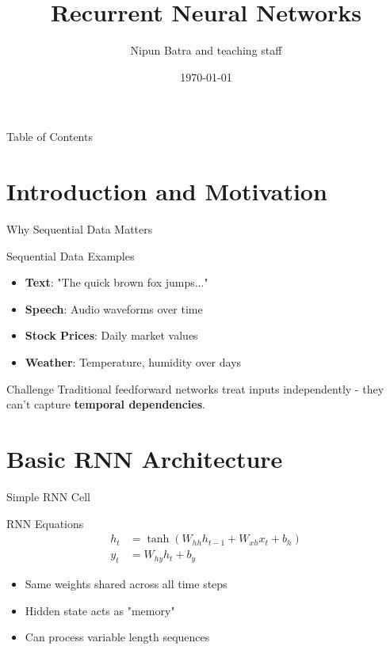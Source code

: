 \documentclass[usenames,dvipsnames]{beamer}
\title{Recurrent Neural Networks}
\date{\today}
\author{Nipun Batra and teaching staff}
\institute{IIT Gandhinagar}
\begin{document}
	\maketitle
	
	\begin{frame}{Table of Contents}
		\tableofcontents[hideallsubsections]
	\end{frame}
	
	\section{Introduction and Motivation}
	
	\begin{frame}{Why Sequential Data Matters}
		\begin{examplebox}{Sequential Data Examples}
			\begin{itemize}
				\item \textbf{Text}: "The quick brown fox jumps..."
				\item \textbf{Speech}: Audio waveforms over time
				\item \textbf{Stock Prices}: Daily market values
				\item \textbf{Weather}: Temperature, humidity over days
			\end{itemize}
		\end{examplebox}
		
		\begin{alertbox}{Challenge}
			Traditional feedforward networks treat inputs independently - they can't capture \textbf{temporal dependencies}.
		\end{alertbox}
	\end{frame}
	
	\section{Basic RNN Architecture}
	
	\begin{frame}{Simple RNN Cell}
		\begin{definitionbox}{RNN Equations}
			\begin{align}
				h_t &= \tanh(W_{hh} h_{t-1} + W_{xh} x_t + b_h) \\
				y_t &= W_{hy} h_t + b_y
			\end{align}
		\end{definitionbox}
		
		\begin{keypointsbox}
			\begin{itemize}
				\item Same weights shared across all time steps
				\item Hidden state acts as "memory"
				\item Can process variable length sequences
			\end{itemize}
		\end{keypointsbox}
	\end{frame}
	
\end{document}
